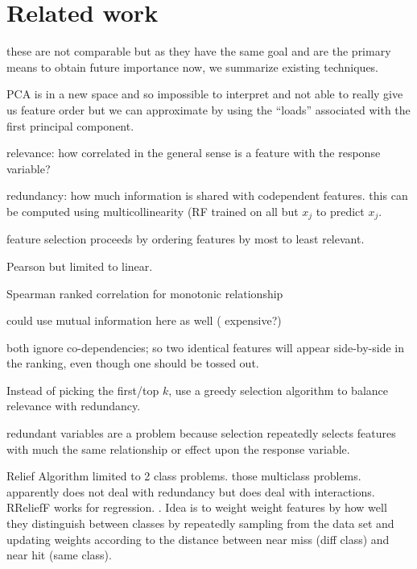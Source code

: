 \documentclass[12pt]{article}
\newcommand{\todo}[1]{{{\color{red}{[#1]}}}}
\begin{document}
\section{Related work}

 these are not comparable but as they have the same goal and are the primary means to obtain future importance now, we summarize existing techniques.

PCA is in a new space and so impossible to interpret and not able to really give us feature order but we can approximate by using the ``loads'' associated with the first principal component.

 relevance: how correlated in the general sense is a feature with the response variable?
 
 redundancy:  how much information is shared with codependent features. this can be computed using multicollinearity (RF trained on all but $x_j$ to predict $x_j$.
 
 feature selection proceeds by ordering features by most to least relevant. 
 
Pearson but limited to linear.

Spearman ranked correlation  for monotonic relationship

 could use mutual information here as well ( expensive?)
 
 both ignore co-dependencies; so two identical features will appear side-by-side in the ranking, even though one should be tossed out.

Instead of picking the first/top $k$, use a greedy selection algorithm to balance relevance with redundancy.

redundant variables are a problem because selection repeatedly selects features with much the same relationship or effect upon the response variable.

\todo{We deal with all possible combinations for codependency's because of the nature of the partial dependence mechanism.}

Relief Algorithm \cite{relief} limited to 2 class problems. \cite{ReliefF}  those multiclass problems. apparently does not deal with redundancy but does deal with interactions. RReliefF works for regression. \cite{RReliefF}. Idea is to weight weight features by how well they distinguish between classes by repeatedly sampling from the data set and updating weights according to the distance between near miss (diff class) and near hit (same class).
\end{document}
